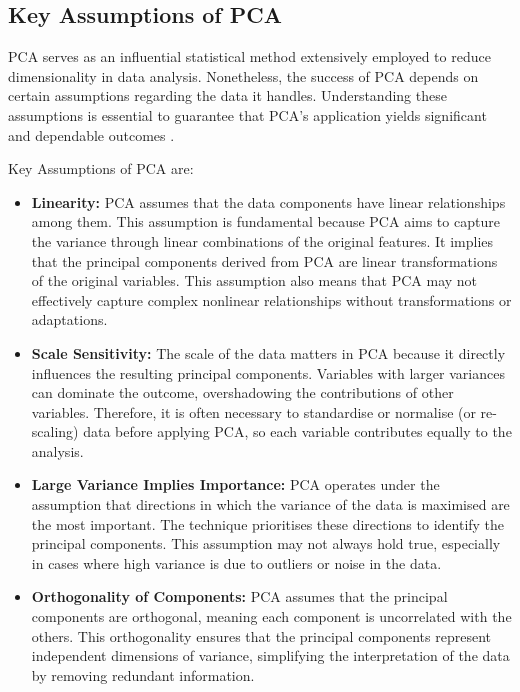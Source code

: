 \documentclass[conference]{IEEEtran}
\begin{document}
\subsection{Key Assumptions of PCA}
PCA serves as an influential statistical method extensively employed to reduce dimensionality in data analysis. Nonetheless, the success of PCA depends on certain assumptions regarding the data it handles. Understanding these assumptions is essential to guarantee that PCA's application yields significant and dependable outcomes \cite{bro2014principal, shlens2014tutorial, wold1987principal, candes2011robust, mckeown1998independent}.

Key Assumptions of PCA are:

\begin{itemize}
    \item \textbf{Linearity:} PCA assumes that the data components have linear relationships among them. This assumption is fundamental because PCA aims to capture the variance through linear combinations of the original features. It implies that the principal components derived from PCA are linear transformations of the original variables. This assumption also means that PCA may not effectively capture complex nonlinear relationships without transformations or adaptations.
    
    \item \textbf{Scale Sensitivity:} The scale of the data matters in PCA because it directly influences the resulting principal components. Variables with larger variances can dominate the outcome, overshadowing the contributions of other variables. Therefore, it is often necessary to standardise or normalise (or re-scaling) data before applying PCA, so each variable contributes equally to the analysis.
    
    \item \textbf{Large Variance Implies Importance:} PCA operates under the assumption that directions in which the variance of the data is maximised are the most important. The technique prioritises these directions to identify the principal components. This assumption may not always hold true, especially in cases where high variance is due to outliers or noise in the data.
    
    \item \textbf{Orthogonality of Components:} PCA assumes that the principal components are orthogonal, meaning each component is uncorrelated with the others. This orthogonality ensures that the principal components represent independent dimensions of variance, simplifying the interpretation of the data by removing redundant information.
    

\end{itemize}
\end{document}
